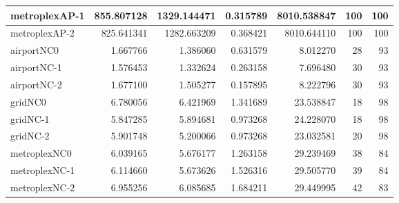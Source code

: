 \begin{longtable}{|l|r|r|r|r|r|r|}
metroplexAP-1 & 855.807128 & 1329.144471 & 0.315789 & 8010.538847 & 100 & 100 \\ \hline
metroplexAP-2 & 825.641341 & 1282.663209 & 0.368421 & 8010.644110 & 100 & 100 \\ \hline
airportNC0 & 1.667766 & 1.386060 & 0.631579 & 8.012270 & 28 & 93 \\ \hline
airportNC-1 & 1.576453 & 1.332624 & 0.263158 & 7.696480 & 30 & 93 \\ \hline
airportNC-2 & 1.677100 & 1.505277 & 0.157895 & 8.222796 & 30 & 93 \\ \hline
gridNC0 & 6.780056 & 6.421969 & 1.341689 & 23.538847 & 18 & 98 \\ \hline
gridNC-1 & 5.847285 & 5.894681 & 0.973268 & 24.228070 & 18 & 98 \\ \hline
gridNC-2 & 5.901748 & 5.200066 & 0.973268 & 23.032581 & 20 & 98 \\ \hline
metroplexNC0 & 6.039165 & 5.676177 & 1.263158 & 29.239469 & 38 & 84 \\ \hline
metroplexNC-1 & 6.114660 & 5.673626 & 1.526316 & 29.505770 & 39 & 84 \\ \hline
metroplexNC-2 & 6.955256 & 6.085685 & 1.684211 & 29.449995 & 42 & 83 \\ \hline
\end{longtable}
